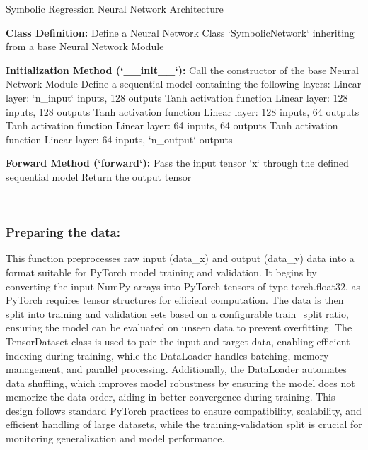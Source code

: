 \documentclass{article}
\begin{document}
\begin{algorithm}[H]
\SetAlgoLined
\caption{Symbolic Regression Neural Network Architecture}
\label{alg:symbolic_network} %

\textbf{Class Definition:}\;
Define a Neural Network Class `SymbolicNetwork` inheriting from a base Neural Network Module\;

\textbf{Initialization Method (`__init__`):}\;
\;
Call the constructor of the base Neural Network Module\;
Define a sequential model containing the following layers:\;
\Indp %
Linear layer: `n_input` inputs, 128 outputs\;
Tanh activation function\;
Linear layer: 128 inputs, 128 outputs\;
Tanh activation function\;
Linear layer: 128 inputs, 64 outputs\;
Tanh activation function\;
Linear layer: 64 inputs, 64 outputs\;
Tanh activation function\;
Linear layer: 64 inputs, `n_output` outputs\;
\Indm %

\textbf{Forward Method (`forward`):}\;
\;
\;
Pass the input tensor `x` through the defined sequential model\;
Return the output tensor\;

\end{algorithm}\\







\subsubsection{Preparing the data:}

This function preprocesses raw input (data\_x) and output (data\_y) data into a format suitable for PyTorch model training and validation. It begins by converting the input NumPy arrays into PyTorch tensors of type torch.float32, as PyTorch requires tensor structures for efficient computation. The data is then split into training and validation sets based on a configurable train\_split ratio, ensuring the model can be evaluated on unseen data to prevent overfitting. The TensorDataset class is used to pair the input and target data, enabling efficient indexing during training, while the DataLoader handles batching, memory management, and parallel processing. Additionally, the DataLoader automates data shuffling, which improves model robustness by ensuring the model does not memorize the data order, aiding in better convergence during training. This design follows standard PyTorch practices to ensure compatibility, scalability, and efficient handling of large datasets, while the training-validation split is crucial for monitoring generalization and model performance.\\
\end{document}
